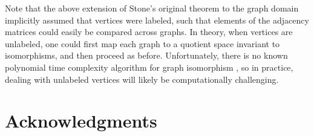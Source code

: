 \documentclass{article}
\newcommand{\hL}{\widehat{L}}
\begin{document}
Note that the above extension of Stone's original theorem to the graph domain implicitly assumed that vertices were labeled, such that elements of the adjacency matrices could easily be compared across graphs.  In theory, when vertices are unlabeled, one could first map each graph to a quotient space invariant to isomorphisms, and then proceed as before.  Unfortunately, 
there is no known polynomial time complexity algorithm for graph isomorphism
\cite{GareyJohnson79}, so in practice, dealing with unlabeled vertices will likely be computationally challenging.












\clearpage



\section*{Acknowledgments}
\end{document}
